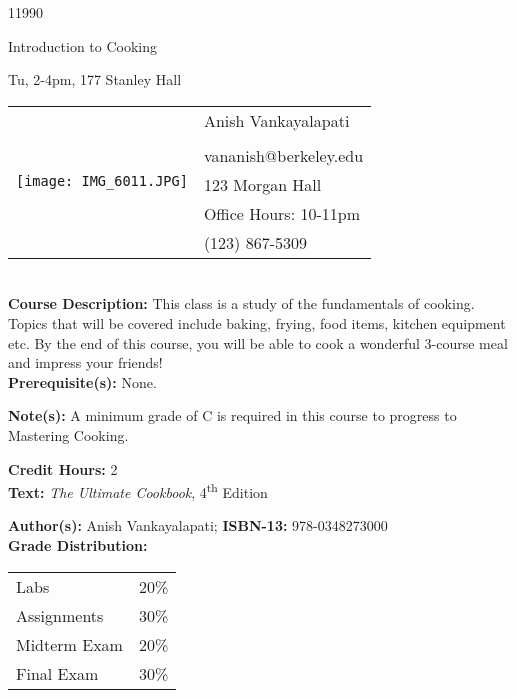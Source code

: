 \documentclass[11pt]{article}
\begin{document}
\LARGE 11990

\LARGE Introduction to Cooking

\LARGE Tu, 2-4pm, 177 Stanley Hall

\vspace{10mm}

\begin{tabular}{ l l }
  \multirow{6}{*}{\texttt{[image: IMG\_6011.JPG]}} & \LARGE Anish Vankayalapati \\\\
  & \large vananish@berkeley.edu \\
  & \large 123 Morgan Hall \\
  & \large Office Hours: 10-11pm \\
  & \large (123) 867-5309 \\
\end{tabular}
\vspace{10mm}
\\

\textbf {Course Description:} This class is a study of the fundamentals of cooking. Topics that will be covered include baking, frying, food items, kitchen equipment etc. By the end of this course, you will be able to cook a wonderful 3-course meal and impress your friends! \\
\textbf {Prerequisite(s):} None.

\textbf {Note(s):} A minimum grade of C is required in this course to progress to Mastering Cooking. 

\textbf {Credit Hours:} 2 \\

\textbf {Text:} \emph{The Ultimate Cookbook}, 4\textsuperscript{th} Edition

\textbf {Author(s):} Anish Vankayalapati;  \textbf {ISBN-13:} 978-0348273000 \\


\textbf {Grade Distribution:} \\
\hspace*{40mm}
\begin{tabular}{ l l }
Labs & 20\% \\
Assignments & 30\% \\
Midterm Exam  & 20\% \\
Final Exam  & 30\%
\end{tabular} \\\\
\end{document}
